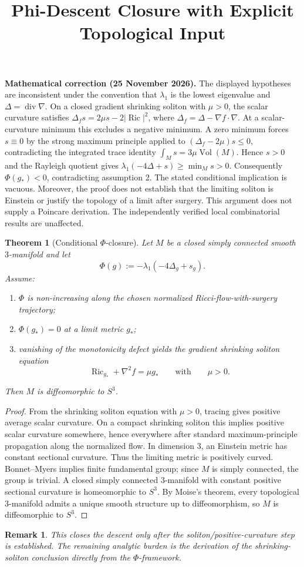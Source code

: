 \documentclass[11pt]{article}
\title{Phi-Descent Closure with Explicit Topological Input}
\author{}
\date{}
\newtheorem{theorem}{Theorem}
\newtheorem{remark}{Remark}
\begin{document}
\maketitle
\par\noindent\textbf{Mathematical correction (25 November 2026).} The displayed hypotheses are inconsistent under the convention that $\lambda_1$ is the lowest eigenvalue and $\Delta=\operatorname{div}\nabla$. On a closed gradient shrinking soliton with $\mu>0$, the scalar curvature satisfies $\Delta_f s=2\mu s-2|\operatorname{Ric}|^2$, where $\Delta_f=\Delta-\nabla f\cdot\nabla$. At a scalar-curvature minimum this excludes a negative minimum. A zero minimum forces $s\equiv0$ by the strong maximum principle applied to $(\Delta_f-2\mu)s\le0$, contradicting the integrated trace identity $\int_M s=3\mu\operatorname{Vol}(M)$. Hence $s>0$ and the Rayleigh quotient gives $\lambda_1(-4\Delta+s)\ge\min_M s>0$. Consequently $\Phi(g_\ast)<0$, contradicting assumption 2. The stated conditional implication is vacuous. Moreover, the proof does not establish that the limiting soliton is Einstein or justify the topology of a limit after surgery. This argument does not supply a Poincare derivation. The independently verified local combinatorial results are unaffected.\par



\begin{theorem}[Conditional $\Phi$-closure]
Let $M$ be a closed simply connected smooth $3$-manifold and let
\[
\Phi(g):=-\lambda_1(-4\Delta_g+s_g).
\]
Assume:
\begin{enumerate}
\item $\Phi$ is non-increasing along the chosen normalized Ricci-flow-with-surgery trajectory;
\item $\Phi(g_\ast)=0$ at a limit metric $g_\ast$;
\item vanishing of the monotonicity defect yields the gradient shrinking soliton equation
\[
\operatorname{Ric}_{g_\ast}+\nabla^2 f=\mu g_\ast
\qquad\text{with}\qquad \mu>0.
\]
\end{enumerate}
Then $M$ is diffeomorphic to $S^3$.
\end{theorem}

\begin{proof}
From the shrinking soliton equation with $\mu>0$, tracing gives positive average scalar curvature.
On a compact shrinking soliton this implies positive scalar curvature somewhere, hence everywhere after
standard maximum-principle propagation along the normalized flow.
In dimension $3$, an Einstein metric has constant sectional curvature.
Thus the limiting metric is positively curved.
Bonnet--Myers implies finite fundamental group; since $M$ is simply connected, the group is trivial.
A closed simply connected $3$-manifold with constant positive sectional curvature is homeomorphic to
$S^3$.
By Moise's theorem, every topological $3$-manifold admits a unique smooth structure up to diffeomorphism,
so $M$ is diffeomorphic to $S^3$.
\end{proof}

\begin{remark}
This closes the descent only after the soliton/positive-curvature step is established.
The remaining analytic burden is the derivation of the shrinking-soliton conclusion directly from the
$\Phi$-framework.
\end{remark}
\end{document}
